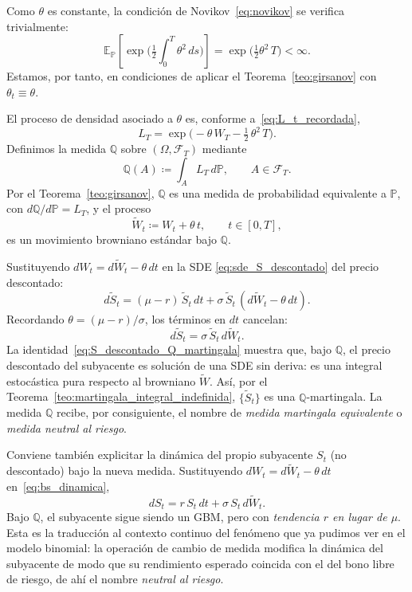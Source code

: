 \documentclass[11pt,a4paper,oneside]{report}
\theoremstyle{plain}
\theoremstyle{definition}
\theoremstyle{remark}
\newcommand{\E}{\mathbb{E}}
\newcommand{\PP}{\mathbb{P}}
\newcommand{\Q}{\mathbb{Q}}
\newcommand{\F}{\mathcal{F}}
\newcommand{\1}{\mathbf{1}}
\newcommand{\eqdef}{\coloneqq}
\begin{document}
Como
$\theta$ es constante, la condición de
Novikov~\eqref{eq:novikov} se verifica trivialmente:
\begin{equation*}
  \E_\PP\!\left[\exp\!\biggl(\tfrac{1}{2}\int_0^T \theta^2\, ds\biggr)\right]
  = \exp\!\biggl(\tfrac{1}{2}\theta^2\, T\biggr) < \infty.
\end{equation*}
Estamos, por tanto, en condiciones de aplicar el
Teorema~\ref{teo:girsanov} con $\theta_t \equiv \theta$.

El proceso de
densidad asociado a $\theta$ es, conforme a~\eqref{eq:L_t_recordada},
\begin{equation}\label{eq:L_T_BS}
  L_T = \exp\!\biggl(-\theta\, W_T - \tfrac{1}{2}\,\theta^2\, T\biggr).
\end{equation}
Definimos la medida $\Q$ sobre $(\Omega, \F_T)$ mediante
\begin{equation*}
  \Q(A) \eqdef \int_A L_T\, d\PP, \qquad A \in \F_T.
\end{equation*}
Por el Teorema~\ref{teo:girsanov}, $\Q$ es una medida de probabilidad
equivalente a $\PP$, con $d\Q/d\PP = L_T$, y el proceso
\begin{equation}\label{eq:W_tilde_BS}
  \widetilde W_t \eqdef W_t + \theta\, t,
  \qquad t \in [0, T],
\end{equation}
es un movimiento browniano estándar bajo $\Q$.

Sustituyendo $dW_t = d\widetilde W_t - \theta\, dt$ en la SDE
\eqref{eq:sde_S_descontado} del precio descontado:
\begin{equation*}
  d\widetilde S_t = (\mu - r)\, \widetilde S_t\, dt
                  + \sigma\, \widetilde S_t\, (d\widetilde W_t - \theta\, dt).
\end{equation*}
Recordando $\theta = (\mu - r)/\sigma$, los términos en $dt$ cancelan:
\begin{equation}\label{eq:S_descontado_Q_martingala}
  \boxed{\; d\widetilde S_t = \sigma\, \widetilde S_t\, d\widetilde W_t. \;}
\end{equation}
La identidad~\eqref{eq:S_descontado_Q_martingala} muestra que, bajo
$\Q$, el precio descontado del subyacente es solución de una SDE sin
deriva: es una integral estocástica pura respecto al browniano
$\widetilde W$. Así, por el
Teorema~\ref{teo:martingala_integral_indefinida}, $\{\widetilde S_t\}$
es una $\Q$-martingala. La medida $\Q$ recibe, por consiguiente, el
nombre de \emph{medida martingala equivalente} o \emph{medida neutral
al riesgo}.

Conviene
también explicitar la dinámica del propio subyacente $S_t$ (no
descontado) bajo la nueva medida. Sustituyendo $dW_t = d\widetilde W_t
- \theta\, dt$ en~\eqref{eq:bs_dinamica},
\begin{equation}\label{eq:S_dinamica_Q}
  \boxed{\; dS_t = r\, S_t\, dt + \sigma\, S_t\, d\widetilde W_t. \;}
\end{equation}
Bajo $\Q$, el subyacente sigue siendo un GBM, pero con \emph{tendencia
$r$ en lugar de $\mu$}. Esta es la traducción al contexto continuo
del fenómeno que ya pudimos ver en el modelo binomial: la operación de
cambio de medida modifica la dinámica del subyacente de modo que su rendimiento esperado coincida con el del bono libre de riesgo, de ahí el nombre \emph{neutral al riesgo}.
\end{document}
